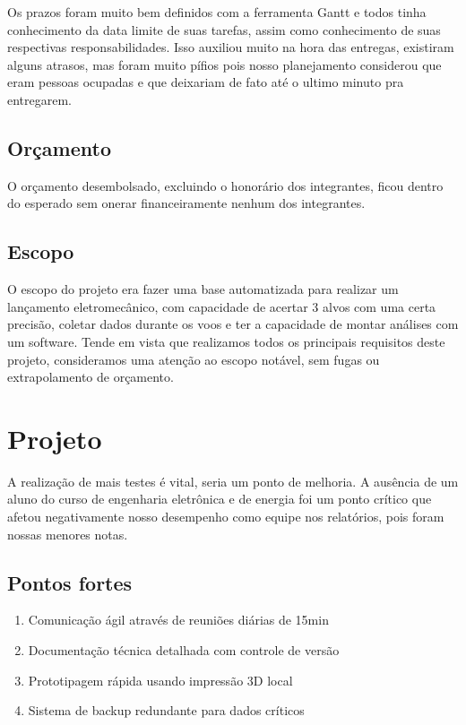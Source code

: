 Os prazos foram muito bem definidos com a ferramenta Gantt e todos tinha conhecimento da data limite de suas tarefas, assim como conhecimento de suas respectivas responsabilidades. Isso auxiliou muito na hora das entregas, existiram alguns atrasos, mas foram muito pífios pois nosso planejamento considerou que eram pessoas ocupadas e que deixariam de fato até o ultimo minuto pra entregarem. 


\subsection{Orçamento}


O orçamento desembolsado, excluindo o honorário dos integrantes, ficou dentro do esperado sem onerar financeiramente nenhum dos integrantes. 

\subsection{Escopo}


O escopo do projeto era fazer uma base automatizada para realizar um lançamento eletromecânico, com capacidade de acertar 3 alvos com uma certa precisão, coletar dados durante os voos e ter a capacidade de montar análises com um software. Tende em vista que realizamos todos os principais requisitos deste projeto, consideramos uma atenção ao escopo notável, sem fugas ou extrapolamento de orçamento. 


\section{Projeto}



A realização de mais testes é vital, seria um ponto de melhoria. A ausência de um aluno do curso de engenharia eletrônica e de energia foi um ponto crítico que afetou negativamente nosso desempenho como equipe nos relatórios, pois foram nossas menores notas. 

\subsection{Pontos fortes}
\begin{enumerate}
	\item Comunicação ágil através de reuniões diárias de 15min
	\item Documentação técnica detalhada com controle de versão
	\item Prototipagem rápida usando impressão 3D local
	\item Sistema de backup redundante para dados críticos
\end{enumerate}

